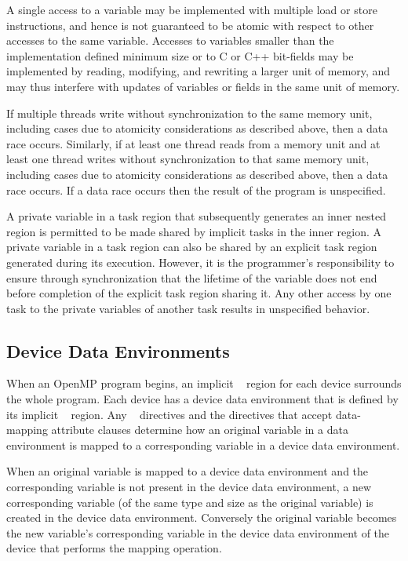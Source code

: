 A single access to a variable may be implemented with multiple load or store
instructions, and hence is not guaranteed to be atomic with respect to other 
accesses to the same variable. Accesses to variables smaller than the 
implementation defined minimum size or to C or C++ bit-fields may be 
implemented by reading, modifying, and rewriting a larger unit of memory, 
and may thus interfere with updates of variables or fields in the same 
unit of memory.

If multiple threads write without synchronization to the same memory 
unit, including cases due to atomicity considerations as described above, 
then a data race occurs. Similarly, if at least one thread reads from a 
memory unit and at least one thread writes without synchronization to 
that same memory unit, including cases due to atomicity considerations 
as described above, then a data race occurs. If a data race occurs then the
result of the program is unspecified.

A private variable in a task region that subsequently generates an inner 
nested  region is permitted to be made shared by implicit 
tasks in the inner  region. A private variable in a task 
region can also be shared by an explicit task region generated during its 
execution. However, it is the programmer's responsibility to ensure through
synchronization that the lifetime of the variable does not end before 
completion of the explicit task region sharing it. Any other access by 
one task to the private variables of another task results in unspecified 
behavior.




\subsection{Device Data Environments}
\label{subsec:Device Data Environments}
When an OpenMP program begins, an implicit ~ 
region for each device surrounds the whole program. Each device has 
a device data environment that is defined by its implicit 
~ region. Any ~ 
directives and the directives that accept data-mapping attribute 
clauses determine how an original variable in a data environment 
is mapped to a corresponding variable in a device data environment.

When an original variable is mapped to a device data environment 
and the corresponding variable is not present in the device data 
environment, a new corresponding variable (of the same type and 
size as the original variable) is created in the device data 
environment. Conversely the original variable becomes the new 
variable's corresponding variable in the device data environment 
of the device that performs the mapping operation.

